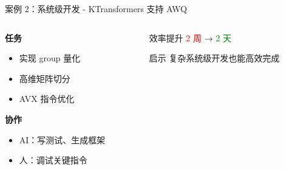 \documentclass[aspectratio=169,xcolor=dvipsnames]{beamer}
\begin{document}
\begin{frame}{案例 2：系统级开发 - KTransformers 支持 AWQ}
  \begin{columns}
    \begin{column}{0.48\textwidth}
      \textbf{任务}
      \begin{itemize}
        \item 实现 group 量化
        \item 高维矩阵切分
        \item AVX 指令优化
      \end{itemize}

      \vspace{0.3cm}

      \textbf{协作}
      \begin{itemize}
        \item AI：写测试、生成框架
        \item 人：调试关键指令
      \end{itemize}
    \end{column}
    \begin{column}{0.48\textwidth}
      \begin{alertblock}{效率提升}
        \textcolor{red}{2 周} → \textcolor{green}{2 天}
      \end{alertblock}

      \vspace{0.5cm}

      \begin{exampleblock}{启示}
        复杂系统级开发也能高效完成
      \end{exampleblock}
    \end{column}
  \end{columns}
\end{frame}
\end{document}
